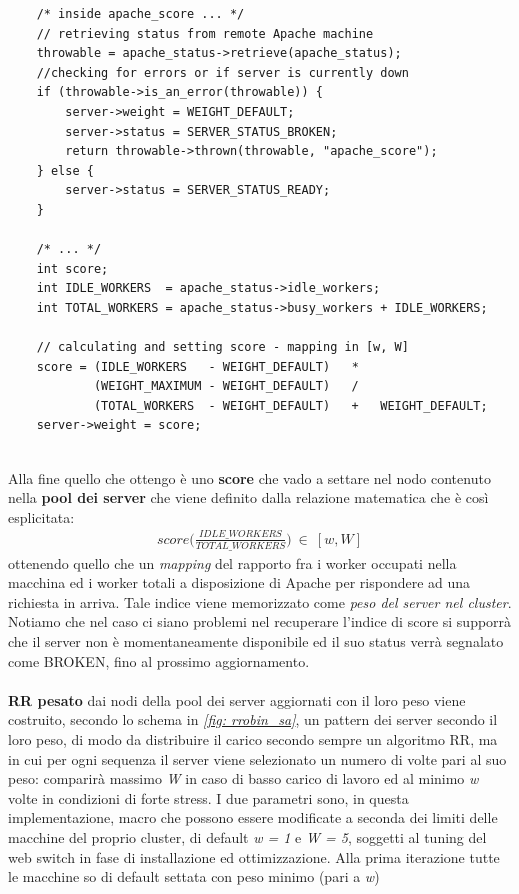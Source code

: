\documentclass[italian]{tktltiki2}
\begin{document}
\begin{lstlisting}
    /* inside apache_score ... */
    // retrieving status from remote Apache machine
    throwable = apache_status->retrieve(apache_status);   
    //checking for errors or if server is currently down
    if (throwable->is_an_error(throwable)) {
        server->weight = WEIGHT_DEFAULT;
        server->status = SERVER_STATUS_BROKEN;
        return throwable->thrown(throwable, "apache_score");
    } else {
        server->status = SERVER_STATUS_READY;
    }
    
    /* ... */
    int score;
    int IDLE_WORKERS  = apache_status->idle_workers;
    int TOTAL_WORKERS = apache_status->busy_workers + IDLE_WORKERS;

    // calculating and setting score - mapping in [w, W]
    score = (IDLE_WORKERS   - WEIGHT_DEFAULT)   *
            (WEIGHT_MAXIMUM - WEIGHT_DEFAULT)   /
            (TOTAL_WORKERS  - WEIGHT_DEFAULT)   +   WEIGHT_DEFAULT;
    server->weight = score;
       
\end{lstlisting}
Alla fine quello che ottengo è uno \textbf{score} che vado a settare nel nodo contenuto nella \textbf{pool dei server} che viene definito dalla relazione matematica che è così esplicitata:
\begin{align*}
	score\Big(\frac{IDLE\_WORKERS}{TOTAL\_WORKERS}\Big) ~ \in ~ [w, W]
\end{align*}
ottenendo quello che un \emph{mapping} del rapporto fra i worker occupati nella macchina ed i worker totali a disposizione di Apache per rispondere ad una richiesta in arriva. Tale indice viene memorizzato come \emph{peso del server nel cluster}.\\
Notiamo che nel caso ci siano problemi nel recuperare l'indice di score si supporrà che il server non è momentaneamente disponibile ed il suo status verrà segnalato come BROKEN, fino al prossimo aggiornamento.\\\\
\textbf{RR pesato} dai nodi della pool dei server aggiornati con il loro peso viene costruito, secondo lo schema in \emph{\ref{fig: rrobin_sa}}, un pattern dei server secondo il loro peso, di modo da distribuire il carico secondo sempre un algoritmo RR, ma in cui per ogni sequenza il server viene selezionato un numero di volte pari al suo peso: comparirà massimo \emph{W} in caso di basso carico di lavoro ed al minimo \emph{w} volte in condizioni di forte stress. I due parametri sono, in questa implementazione, macro che possono essere modificate a seconda dei limiti delle macchine del proprio cluster, di default \emph{w = 1} e \emph{W = 5}, soggetti al tuning del web switch in fase di installazione ed ottimizzazione. Alla prima iterazione tutte le macchine so di default settata con peso minimo (pari a \emph{w})\\\\ 
\end{document}
